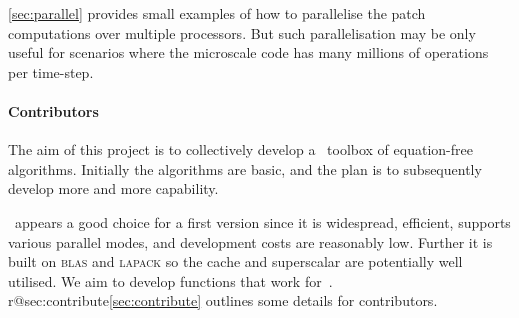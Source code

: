 \cref{sec:parallel} provides small examples of how to parallelise the patch computations over multiple processors.  
But such parallelisation may be only useful for scenarios where the microscale code has many millions of operations per time-step.



\paragraph{Contributors}
The aim of this project is to collectively develop a \script\ toolbox of equation-free algorithms.
Initially the algorithms are basic, and the plan is to subsequently develop more and more capability.

\Matlab\ appears a good choice for a first version since it is widespread, efficient, supports various parallel modes, and development costs are reasonably low.
Further it is built on \textsc{blas} and \textsc{lapack} so the cache and superscalar \cpu{} are potentially well utilised.
We aim to develop functions that work for~\script.
\ifcsname r@sec:contribute\endcsname\cref{sec:contribute} outlines some details for contributors.\fi



